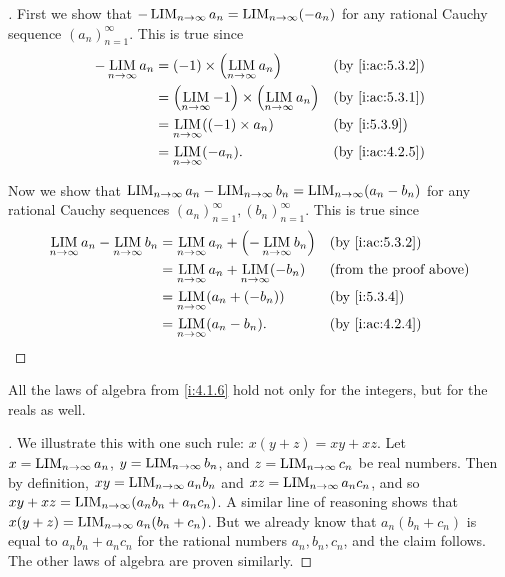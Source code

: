 \begin{proof}[]
  First we show that \(-\operatorname*{LIM}_{n \to \infty} a_n = \operatorname*{LIM}_{n \to \infty} (-a_n)\) for any rational Cauchy sequence \((a_n)_{n = 1}^\infty\).
  This is true since
  \begin{align*}
    -\LIM_{n \to \infty} a_n & = (-1) \times \pa{\LIM_{n \to \infty} a_n}                        &  & \by{i:ac:5.3.2} \\
                             & = \pa{\LIM_{n \to \infty} -1} \times \pa{\LIM_{n \to \infty} a_n} &  & \by{i:ac:5.3.1} \\
                             & = \LIM_{n \to \infty} ((-1) \times a_n)                           &  & \by{i:5.3.9}    \\
                             & = \LIM_{n \to \infty} (-a_n).                                     &  & \by{i:ac:4.2.5}
  \end{align*}

  Now we show that \(\operatorname*{LIM}_{n \to \infty} a_n - \operatorname*{LIM}_{n \to \infty} b_n = \operatorname*{LIM}_{n \to \infty} (a_n - b_n)\) for any rational Cauchy sequences \((a_n)_{n = 1}^\infty, (b_n)_{n = 1}^\infty\).
  This is true since
  \begin{align*}
    \LIM_{n \to \infty} a_n - \LIM_{n \to \infty} b_n & = \LIM_{n \to \infty} a_n + \pa{-\LIM_{n \to \infty} b_n} &  & \by{i:ac:5.3.2}               \\
                                                      & = \LIM_{n \to \infty} a_n + \LIM_{n \to \infty} (-b_n)    &  & \text{(from the proof above)} \\
                                                      & = \LIM_{n \to \infty} (a_n + (-b_n))                      &  & \by{i:5.3.4}                  \\
                                                      & = \LIM_{n \to \infty} (a_n - b_n).                        &  & \by{i:ac:4.2.4}
  \end{align*}
\end{proof}

\begin{prop}\label{i:5.3.11}
  All the laws of algebra from \cref{i:4.1.6} hold not only for the integers, but for the reals as well.
\end{prop}

\begin{proof}[]
  We illustrate this with one such rule: \(x(y + z) = xy + xz\).
  Let \(x = \operatorname*{LIM}_{n \to \infty} a_n\), \(y = \operatorname*{LIM}_{n \to \infty} b_n\), and \(z = \operatorname*{LIM}_{n \to \infty} c_n\) be real numbers.
  Then by definition, \(xy = \operatorname*{LIM}_{n \to \infty} a_n b_n\) and \(xz = \operatorname*{LIM}_{n \to \infty} a_n c_n\), and so \(xy + xz = \operatorname*{LIM}_{n \to \infty} (a_n b_n + a_n c_n)\).
  A similar line of reasoning shows that \(x(y + z) = \operatorname*{LIM}_{n \to \infty} a_n (b_n + c_n)\).
  But we already know that \(a_n (b_n + c_n)\) is equal to \(a_n b_n + a_n c_n\) for the rational numbers \(a_n, b_n, c_n\), and the claim follows.
  The other laws of algebra are proven similarly.
\end{proof}

